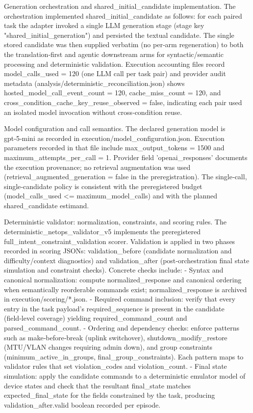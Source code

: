 \documentclass[conference]{IEEEtran}
\begin{document}
Generation orchestration and shared\_initial\_candidate implementation. The orchestration implemented shared\_initial\_candidate as follows: for each paired task the adapter invoked a single LLM generation stage (stage key "shared\_initial\_generation") and persisted the textual candidate. The single stored candidate was then supplied verbatim (no per‑arm regeneration) to both the translation‑first and agentic downstream arms for syntactic/semantic processing and deterministic validation. Execution accounting files record model\_calls\_used = 120 (one LLM call per task pair) and provider audit metadata (analysis/deterministic\_reconciliation.json) shows hosted\_model\_call\_event\_count = 120, cache\_miss\_count = 120, and cross\_condition\_cache\_key\_reuse\_observed = false, indicating each pair used an isolated model invocation without cross‑condition reuse.

Model configuration and call semantics. The declared generation model is gpt‑5‑mini as recorded in execution/model\_configuration.json. Execution parameters recorded in that file include max\_output\_tokens = 1500 and maximum\_attempts\_per\_call = 1. Provider field 'openai\_responses' documents the execution provenance; no retrieval augmentation was used (retrieval\_augmented\_generation = false in the preregistration). The single‑call, single‑candidate policy is consistent with the preregistered budget (model\_calls\_used <= maximum\_model\_calls) and with the planned shared\_candidate estimand.

Deterministic validator: normalization, constraints, and scoring rules. The deterministic\_netops\_validator\_v5 implements the preregistered full\_intent\_constraint\_validation scorer. Validation is applied in two phases recorded in scoring JSONs: validation\_before (candidate normalization and difficulty/context diagnostics) and validation\_after (post‑orchestration final state simulation and constraint checks). Concrete checks include:
- Syntax and canonical normalization: compute normalized\_response and canonical ordering when semantically reorderable commands exist; normalized\_response is archived in execution/scoring/*.json.
- Required command inclusion: verify that every entry in the task payload's required\_sequence is present in the candidate (field‑level coverage) yielding required\_command\_count and parsed\_command\_count.
- Ordering and dependency checks: enforce patterns such as make‑before‑break (uplink switchover), shutdown\_modify\_restore (MTU/VLAN changes requiring admin down), and group constraints (minimum\_active\_in\_groups, final\_group\_constraints). Each pattern maps to validator rules that set violation\_codes and violation\_count.
- Final state simulation: apply the candidate commands to a deterministic emulator model of device states and check that the resultant final\_state matches expected\_final\_state for the fields constrained by the task, producing validation\_after.valid boolean recorded per episode.
\end{document}
